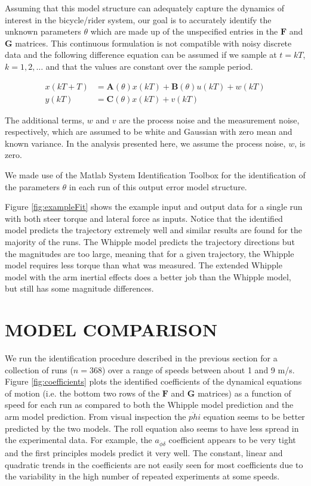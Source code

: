 \documentclass[twocolumn,10pt]{asme2e}
\begin{document}
Assuming that this model structure can adequately capture the dynamics of
interest in the bicycle/rider system, our goal is to accurately identify the
unknown parameters $\theta$ which are made up of the unspecified entries in the
$\mathbf{F}$ and $\mathbf{G}$ matrices. This continuous formulation is not
compatible with noisy discrete data and the following difference equation can
be assumed if we sample at $t=kT$, $k=1,2,\dots$ and that the values are
constant over the sample period.

\begin{equation}
	\begin{split}
		x(kT + T) & = \mathbf{A}(\theta)x(kT) + \mathbf{B}(\theta)u(kT) + w(kT)\\
		y(kT) & = \mathbf{C}(\theta)x(kT) + v(kT)
	\end{split}
\end{equation}

The additional terms, $w$ and $v$ are the process noise and the measurement
noise, respectively, which are assumed to be white and Gaussian with zero mean
and known variance. In the analysis presented here, we assume the process
noise, $w$, is zero.

We made use of the Matlab System Identification Toolbox for the identification
of the parameters $\theta$ in each run of this output error model structure.

Figure \ref{fig:exampleFit} shows the example input and output data for a
single run with both steer torque and lateral force as inputs. Notice that the
identified model predicts the trajectory extremely well and similar results are
found for the majority of the runs. The Whipple model predicts the trajectory
directions but the magnitudes are too large, meaning that for a given
trajectory, the Whipple model requires less torque than what was measured. The
extended Whipple model with the arm inertial effects does a better job than the
Whipple model, but still has some magnitude differences.

\section*{MODEL COMPARISON}
We run the identification procedure described in the previous section for a
collection of runs ($n=368$) over a range of speeds between about 1 and 9 m/s.
Figure \ref{fig:coefficients} plots the identified coefficients of the
dynamical equations of motion (i.e. the bottom two rows of the \(\mathbf{F}\)
and \(\mathbf{G}\) matrices) as a function of speed for each run as compared to
both the Whipple model prediction and the arm model prediction. From visual
inspection the $\ddot{phi}$ equation seems to be better predicted by the two
models. The roll equation also seems to have less spread in the experimental data. For
example, the \(a_{\ddot{\phi}\delta}\) coefficient appears to be very tight and the
first principles models predict it very well. The constant, linear and
quadratic trends in the coefficients are not easily seen for most coefficients
due to the variability in the high number of repeated experiments at some speeds.
\end{document}
